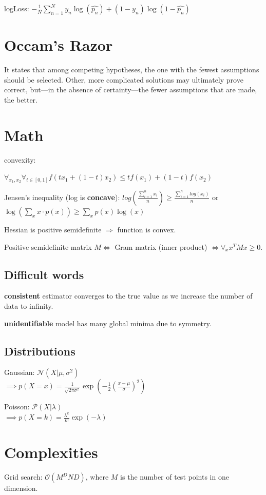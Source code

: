 \documentclass[10pt,a4paper,landscape]{article}
\begin{document}
\begin{multicols*}{4}
  logLoss: $- \frac{1}{N}  \sum_{n=1}^{N} y_n \log(\hat{p_n}) + (1-y_n) \log(1-\hat{p_n})$

\section{Occam's Razor}
  It states that among competing hypotheses, the one with the fewest assumptions should be selected. Other, more complicated solutions may ultimately prove correct, but—in the absence of certainty—the fewer assumptions that are made, the better.
\section{Math}
convexity: 

$\forall_{x_1, x_2} \forall_{t\in[0,1]} f(tx_1 + (1-t)x_2) \le tf(x_1) + (1-t)f(x_2)$

Jensen's inequality (log is \textbf{concave}): $log(\frac{\sum_{i=1}^n x_i}{n}) \ge \frac{\sum_{i=1}^n log(x_i)}{n}$
or
$\log ( \sum_x x \cdot p(x) ) \geq \sum_x p(x) \log(x)$

Hessian is positive semidefinite $\Rightarrow$ function is convex.

Positive semidefinite matrix $M \Leftrightarrow$ Gram matrix (inner product) $\Leftrightarrow \forall_x x^T M x \ge 0$.

\subsection{Difficult words}
\textbf{consistent} estimator converges to the true value as we increase the
number of data to infinity.

\textbf{unidentifiable} model has many global minima due to symmetry.

\subsection{Distributions}
  Gaussian: $\mathcal{N}(X| \mu, \sigma^2)$ \\
  $\implies p(X = x) = \frac{1}{\sqrt{2 \pi \sigma^2}} \exp{(- \frac{1}{2} ( \frac{x - \mu}{\sigma} )^2)}$

  Poisson: $\mathcal{P}(X| \lambda)$ \\
  $\implies p(X = k) = \frac{\lambda ^ k}{k!} \exp{(- \lambda)}$

\section{Complexities}
Grid search: $\mathcal{O}(M^D N D)$, where $M$ is the number of test points in one dimension.


\end{multicols*}
\end{document}
